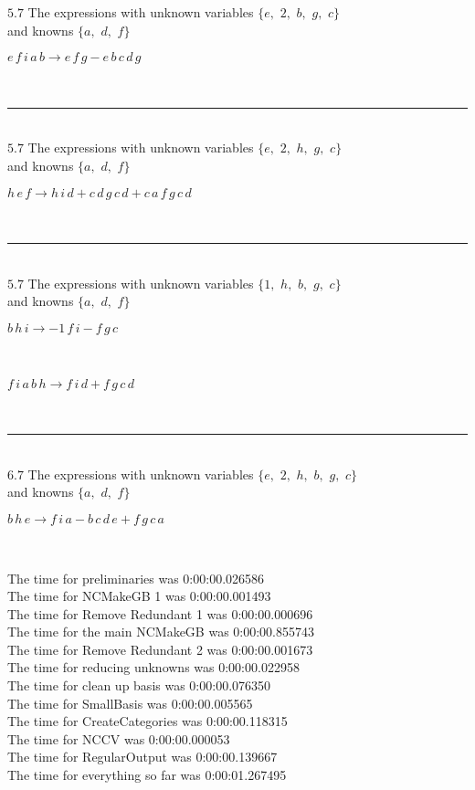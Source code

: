 \documentclass[rep10,leqno]{report}
\begin{document}
$5.7$  The expressions with unknown variables $\{e,
$ $
2,
$ $
b,
$ $
g,
$ $
c\}$\\
and knowns $\{a,
$ $
d,
$ $
f\}$\smallskip\\
\begin{minipage}{6in}
$
e\,
 f\,
 i\,
 a\,
 b\rightarrow e\,
 f\,
 g - e\,
 b\,
 c\,
 d\,
 g
$
\end{minipage}\\
\rule[3pt]{6in}{.7pt}\\
$5.7$  The expressions with unknown variables $\{e,
$ $
2,
$ $
h,
$ $
g,
$ $
c\}$\\
and knowns $\{a,
$ $
d,
$ $
f\}$\smallskip\\
\begin{minipage}{6in}
$
h\,
 e\,
 f\rightarrow h\,
 i\,
 d + c\,
 d\,
 g\,
 c\,
 d + c\,
 a\,
 f\,
 g\,
 c\,
 d
$
\end{minipage}\\
\rule[3pt]{6in}{.7pt}\\
$5.7$  The expressions with unknown variables $\{1,
$ $
h,
$ $
b,
$ $
g,
$ $
c\}$\\
and knowns $\{a,
$ $
d,
$ $
f\}$\smallskip\\
\begin{minipage}{6in}
$
b\,
 h\,
 i\rightarrow -1\,
 f\,
 i - f\,
 g\,
 c
$
\end{minipage}\medskip \\
\begin{minipage}{6in}
$
f\,
 i\,
 a\,
 b\,
 h\rightarrow f\,
 i\,
 d + f\,
 g\,
 c\,
 d
$
\end{minipage}\\
\rule[3pt]{6in}{.7pt}\\
$6.7$  The expressions with unknown variables $\{e,
$ $
2,
$ $
h,
$ $
b,
$ $
g,
$ $
c\}$\\
and knowns $\{a,
$ $
d,
$ $
f\}$\smallskip\\
\begin{minipage}{6in}
$
b\,
 h\,
 e\rightarrow f\,
 i\,
 a - b\,
 c\,
 d\,
 e + f\,
 g\,
 c\,
 a
$
\end{minipage}\\
\vspace{10pt}

\noindent
The time for preliminaries was 0:00:00.026586\\
The time for NCMakeGB 1 was 0:00:00.001493\\
The time for Remove Redundant 1 was 0:00:00.000696\\
The time for the main NCMakeGB was 0:00:00.855743\\
The time for Remove Redundant 2 was 0:00:00.001673\\
The time for reducing unknowns was 0:00:00.022958\\
The time for clean up basis was 0:00:00.076350\\
The time for SmallBasis was 0:00:00.005565\\
The time for CreateCategories was 0:00:00.118315\\
The time for NCCV was 0:00:00.000053\\
The time for RegularOutput was 0:00:00.139667\\
The time for everything so far was 0:00:01.267495\\
\end{document}
